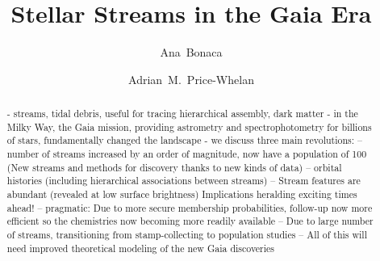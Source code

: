 \documentclass[final,5p,times,twocolumn,authoryear]{elsarticle}
\begin{document}
\begin{frontmatter}



\title{Stellar Streams in the Gaia Era}


\author[ociw]{Ana~Bonaca}
\author[cca]{Adrian~M.~Price-Whelan}




\begin{abstract}
- streams, tidal debris, useful for tracing hierarchical assembly, dark matter
- in the Milky Way, the Gaia mission, providing astrometry and spectrophotometry for billions of stars, fundamentally changed the landscape
- we discuss three main revolutions:
-- number of streams increased by an order of magnitude, now have a population of 100 (New streams and methods for discovery thanks to new kinds of data)
-- orbital histories (including hierarchical associations between streams)
-- Stream features are abundant (revealed at low surface brightness)
Implications heralding exciting times ahead!
-- pragmatic: Due to more secure membership probabilities, follow-up now more efficient so the chemistries now becoming more readily available
-- Due to large number of streams, transitioning from stamp-collecting to population studies
-- All of this will need improved theoretical modeling of the new Gaia discoveries
\end{abstract}


\end{frontmatter}
\end{document}
